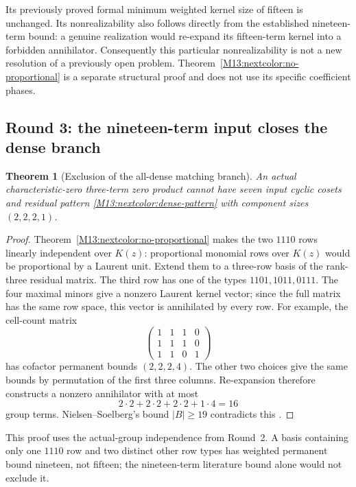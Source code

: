 \documentclass[11pt,a4paper,oneside]{report}
\newtheorem{theorem}{Theorem}[section]
\theoremstyle{definition}
\theoremstyle{remark}
\begin{document}
Its previously proved formal minimum weighted kernel size of fifteen
is unchanged. Its nonrealizability also follows directly from the
established nineteen-term bound: a genuine realization would
re-expand its fifteen-term kernel into a forbidden annihilator.
Consequently this particular nonrealizability is not a new resolution
of a previously open problem. Theorem~\ref{M13:nextcolor:no-proportional}
is a separate structural proof and does not use its specific
coefficient phases.

\subsection{Round 3: the nineteen-term input closes the dense branch}

\begin{theorem}[Exclusion of the all-dense matching branch]
\label{M13:nextcolor:dense-closed}
An actual characteristic-zero three-term zero product cannot have
seven input cyclic cosets and residual pattern
\eqref{M13:nextcolor:dense-pattern} with component sizes $(2,2,2,1)$.
\end{theorem}
\begin{proof}
Theorem~\ref{M13:nextcolor:no-proportional} makes the two $1110$ rows
linearly independent over $K(z)$: proportional monomial rows over
$K(z)$ would be proportional by a Laurent unit. Extend them to
a three-row basis of the rank-three residual matrix. The third
row has one of the types $1101,1011,0111$.
The four maximal minors give a nonzero Laurent kernel vector;
since the full matrix has the same row space, this vector is
annihilated by every row. For example, the cell-count matrix
\[
 \begin{pmatrix}1&1&1&0\\1&1&1&0\\1&1&0&1\end{pmatrix}
\]
has cofactor permanent bounds $(2,2,2,4)$. The other two choices
give the same bounds by permutation of the first three columns.
Re-expansion therefore constructs a nonzero annihilator with at
most
\[
 2\cdot2+2\cdot2+2\cdot2+1\cdot4=16
\]
group terms. Nielsen--Soelberg's bound $|B|\ge19$ contradicts
this \cite{B:NS}.
\end{proof}

This proof uses the actual-group independence from Round~2.
A basis containing only one $1110$ row and two distinct other
row types has weighted permanent bound nineteen, not fifteen;
the nineteen-term literature bound alone would not exclude it.
\end{document}
